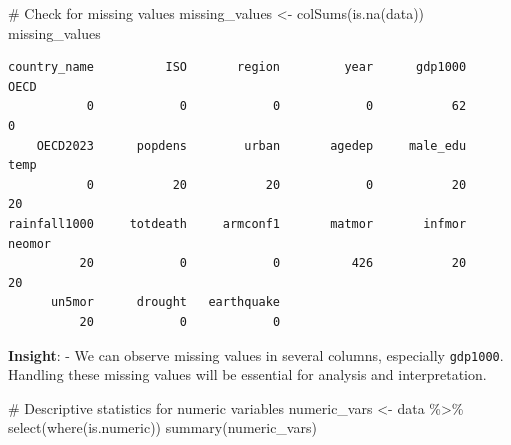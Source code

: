 \documentclass[
  letterpaper,
  DIV=11,
  numbers=noendperiod]{scrartcl}
\newenvironment{Shaded}{\begin{snugshade}}{\end{snugshade}}
\newcommand{\CommentTok}[1]{\textcolor[rgb]{0.37,0.37,0.37}{#1}}
\newcommand{\FunctionTok}[1]{\textcolor[rgb]{0.28,0.35,0.67}{#1}}
\newcommand{\NormalTok}[1]{\textcolor[rgb]{0.00,0.23,0.31}{#1}}
\newcommand{\OtherTok}[1]{\textcolor[rgb]{0.00,0.23,0.31}{#1}}
\newcommand{\SpecialCharTok}[1]{\textcolor[rgb]{0.37,0.37,0.37}{#1}}
\begin{document}
\begin{Shaded}
\begin{Highlighting}[]
\CommentTok{\# Check for missing values}
\NormalTok{missing\_values }\OtherTok{\textless{}{-}} \FunctionTok{colSums}\NormalTok{(}\FunctionTok{is.na}\NormalTok{(data))}
\NormalTok{missing\_values}
\end{Highlighting}
\end{Shaded}

\begin{verbatim}
country_name          ISO       region         year      gdp1000         OECD 
           0            0            0            0           62            0 
    OECD2023      popdens        urban       agedep     male_edu         temp 
           0           20           20            0           20           20 
rainfall1000     totdeath     armconf1       matmor       infmor       neomor 
          20            0            0          426           20           20 
      un5mor      drought   earthquake 
          20            0            0 
\end{verbatim}

\textbf{Insight}: - We can observe missing values in several columns,
especially \texttt{gdp1000}. Handling these missing values will be
essential for analysis and interpretation.

\begin{Shaded}
\begin{Highlighting}[]
\CommentTok{\# Descriptive statistics for numeric variables}
\NormalTok{numeric\_vars }\OtherTok{\textless{}{-}}\NormalTok{ data }\SpecialCharTok{\%\textgreater{}\%} \FunctionTok{select}\NormalTok{(}\FunctionTok{where}\NormalTok{(is.numeric))}
\FunctionTok{summary}\NormalTok{(numeric\_vars)}
\end{Highlighting}
\end{Shaded}
\end{document}

